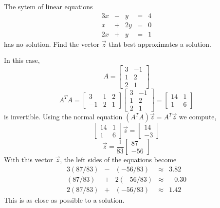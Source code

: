 \documentclass{ximera}
\begin{document}
    \begin{example}\label{ex:leastSq2}
        The sytem of linear equations
        $$\begin{matrix}3x & - & y&=&4\\x&+&2y&=&0\\2x&+&y&=&1\end{matrix}$$
        has no solution.  Find the vector $\vec{z}$ that best approximates a solution.

        \begin{explanation}
            In this case,
            $$A=\begin{bmatrix}3&-1\\1&2\\2&1\end{bmatrix}$$            $$A^TA=\begin{bmatrix}3&1&2\\-1&2&1\end{bmatrix}\begin{bmatrix}3&-1\\1&2\\2&1\end{bmatrix}=\begin{bmatrix}14&1\\1&6\end{bmatrix}$$
            is invertible.  Using the normal equation $\left(A^TA\right)\vec{z}=A^T\vec{z}$ we compute, $$\begin{bmatrix}14&1\\1&6\end{bmatrix}\vec{z}=\begin{bmatrix}14\\-3\end{bmatrix}$$ $$\vec{z}=\frac{1}{83}\begin{bmatrix}87\\-56\end{bmatrix}$$
            With this vector $\vec{z}$, the left sides of the equations become
            $$\begin{matrix}3(87/83) & - & (-56/83)&\approx&3.82\\(87/83)&+&2(-56/83)&\approx&-0.30\\2(87/83)&+&(-56/83)&\approx&1.42\end{matrix}$$
            This is as close as possible to a solution.
        \end{explanation}
    \end{example}
\end{document}
